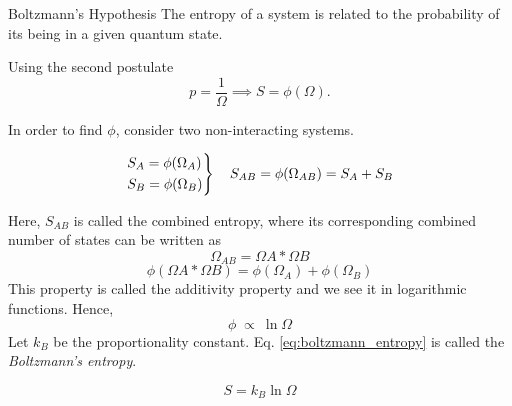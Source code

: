 \begin{law*}{Boltzmann's Hypothesis}
The entropy of a system is related to the probability of its being in a given quantum state.
\end{law*}

Using the second postulate
\begin{equation}
    p = \frac{1}{\Omega} \implies S=\phi(\Omega).
\end{equation}

In order to find $\phi$, consider two non-interacting systems.

\begin{equation}
    \begin{rcases}
S_A = \phi(\Omega_A)\\
S_B = \phi(\Omega_B)
\end{rcases}
\quad
S_{AB}= \phi(\Omega_{AB}) = S_A + S_B 
\end{equation}

Here, $S_{AB}$ is called the combined entropy, where its corresponding combined number of states can be written as
\begin{equation}    \Omega_{AB}=\Omega{A}*\Omega{B}
\end{equation}
\begin{equation}
\phi(\Omega{A}*\Omega{B})=\phi(\Omega_A)+\phi(\Omega_B)
\end{equation}
This property is called the additivity property and we see it in logarithmic functions. Hence,
\begin{equation}
    \phi \; \propto \: \ln{\Omega}
\end{equation}
Let $k_B$ be the proportionality constant. Eq. \ref{eq:boltzmann_entropy} is called the \emph{Boltzmann's entropy}.

\begin{equation}
    \boxed{S=k_B\ln{\Omega}}
    \label{eq:boltzmann_entropy}
\end{equation}

\pagebreak

